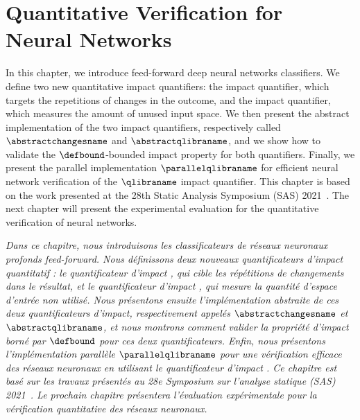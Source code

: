 \setchapterpreamble[u]{\margintoc}


\chapter{Quantitative Verification for Neural Networks}

\marginemptybox{9.6cm}

In this chapter, we introduce feed-forward deep neural networks classifiers.
We define two new quantitative impact quantifiers: the \changesname{} impact quantifier, which targets the repetitions of changes in the outcome, and the \qlibraname{} impact quantifier, which measures the amount of unused input space. We then present the abstract implementation of the two impact quantifiers, respectively called $\abstractchangesname$ and $\abstractqlibraname$, and we show how to validate the $\defbound$-bounded impact property for both quantifiers. Finally, we present the parallel implementation $\parallelqlibraname$ for efficient neural network verification of the $\qlibraname$ impact quantifier.
This chapter is based on the work presented at the 28th Static Analysis Symposium (SAS) 2021~.
The next chapter will present the experimental evaluation for the quantitative verification of neural networks.


\frenchdiv

\emph{Dans ce chapitre, nous introduisons les classificateurs de réseaux neuronaux profonds feed-forward. Nous définissons deux nouveaux quantificateurs d'impact quantitatif : le quantificateur d'impact \changesname{}, qui cible les répétitions de changements dans le résultat, et le quantificateur d'impact \qlibraname{}, qui mesure la quantité d'espace d'entrée non utilisé. Nous présentons ensuite l'implémentation abstraite de ces deux quantificateurs d'impact, respectivement appelés $\abstractchangesname$ et $\abstractqlibraname$, et nous montrons comment valider la propriété d'impact borné par $\defbound$ pour ces deux quantificateurs. Enfin, nous présentons l'implémentation parallèle $\parallelqlibraname$ pour une vérification efficace des réseaux neuronaux en utilisant le quantificateur d'impact \qlibraname{}. Ce chapitre est basé sur les travaux présentés au 28e Symposium sur l'analyse statique (SAS) 2021~\cite{Mazzucato2021}. Le prochain chapitre présentera l'évaluation expérimentale pour la vérification quantitative des réseaux neuronaux.}

% 
% 
% 
% 
% 


